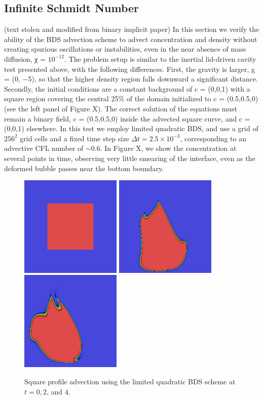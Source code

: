 \documentclass[final]{siamltex}
\begin{document}
\subsection{Infinite Schmidt Number}
(text stolen and modified from binary implicit paper)
In this section we verify the ability of the BDS advection scheme to advect concentration and
density without creating spurious oscillations or instabilities, even in the near absence of mass diffusion,
χ = $10^{-12}$. The problem setup is similar to the inertial lid-driven cavity test presented above, with
the following differences. First, the gravity is larger, g = (0, −5), so that the higher density region
falls downward a significant distance. Secondly, the initial conditions are a constant background
of c = (0,0,1) with a square region covering the central 25\% of the domain initialized to c = (0.5,0.5,0) (see the
left panel of Figure X). The correct solution of the equations must remain a binary field, c = (0.5,0.5,0)
inside the advected square curve, and c = (0,0,1) elsewhere. In this test we employ limited quadratic
BDS, and use a grid of $256^2$ grid cells and a fixed time step size $\Delta t = 2.5\times 10^{-3}$, corresponding to
an advective CFL number of $\sim 0.6$. In Figure X, we show the concentration at several points in
time, observing very little smearing of the interface, even as the deformed bubble passes near the
bottom boundary.
\begin{figure}[h]
\begin{center}
\includegraphics[width=1.9in]{square_movie1}
\includegraphics[width=1.9in]{square_movie2}
\includegraphics[width=1.9in]{square_movie3}
\caption{Square profile advection using the limited quadratic BDS scheme 
at $t=0,2$, and $4$.}
\label{fig:square2}
\end{center}
\end{figure}
\end{document}
